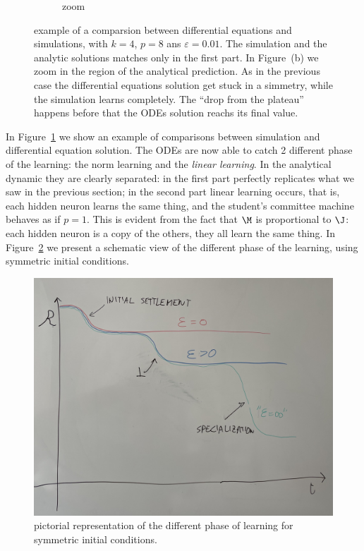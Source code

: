 \begin{figure}
\begin{subfigure}{0.45\textwidth}
    \caption{zoom}
  \end{subfigure}
  \caption{
    example of a comparsion between differential equations and simulations, with \(k=4\), \(p=8\) ans \(\varepsilon=0.01\).
    The simulation and the analytic solutions matches only in the first part.
    In Figure~(b) we zoom in the region of the analytical prediction.
    As in the previous case the differential equations solution get stuck in a simmetry,
    while the simulation learns completely. The ``drop from the plateau'' happens before 
    that the ODEs solution reachs its final value. 
  }
  \label{fig:example-small-eps}
\end{figure}

In Figure~\ref{fig:example-small-eps} we show an example of comparisons between simulation
and differential equation solution. The ODEs are now able to catch 2 different phase of 
the learning: the norm learning and the \emph{linear learning}. In the analytical dynamic
they are clearly separated: in the first part perfectly replicates what we saw in the previous section;
in the second part linear learning occurs, that is, each hidden neuron learns the same thing,
and the student's committee machine behaves as if \(p=1\).
This is evident from the fact that \(\M\) is proportional to \(\J\):
each hidden neuron is a copy of the others, they all learn the same thing.
In Figure~\ref{fig:pictorial-symmetric-learning} we present a schematic view of the different phase of the learning,
using symmetric initial conditions.
\begin{figure}
  \centering
  \includegraphics[width=.7\textwidth]{figures/symmetric-ic-expected-plateaus.jpg}
  
  \caption{
    pictorial representation of the different phase of learning for symmetric initial conditions.
  }
  \label{fig:pictorial-symmetric-learning}
\end{figure}

